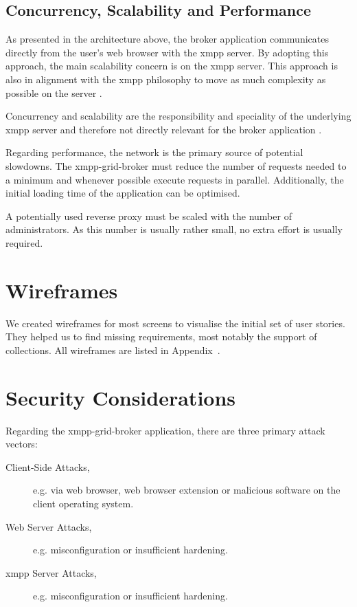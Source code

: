 \subsection{Concurrency, Scalability and Performance}

As presented in the architecture above, the \gls{broker} application communicates directly from the user's web browser with the \gls{xmpp} server.
By adopting this approach, the main scalability concern is on the \gls{xmpp} server.
This approach is also in alignment with the \gls{xmpp} philosophy to move as much complexity as possible on the server \cite{definitive-guide-xmpp}.

Concurrency and scalability are the responsibility and speciality of the underlying \gls{xmpp} server and therefore not directly relevant for the \gls{broker} application \cite{definitive-guide-xmpp}.

Regarding performance, the network is the primary source of potential slowdowns.
The \gls{xmpp-grid-broker} must reduce the number of requests needed to a minimum and whenever possible execute requests in parallel.
Additionally, the initial loading time of the application can be optimised.

A potentially used reverse proxy must be scaled with the number of administrators.
As this number is usually rather small, no extra effort is usually required.

\section{Wireframes}

We created wireframes for most screens to visualise the initial set of user stories.
They helped us to find missing requirements, most notably the support of collections.
All wireframes are listed in Appendix~.

\section{Security Considerations}\label{sec:security-considerations}

Regarding the \gls{xmpp-grid-broker} application, there are three primary attack vectors:

\begin{description}
    \item[Client-Side Attacks,] e.g. via web browser, web browser extension or malicious software on the client operating system.
    \item[Web Server Attacks,] e.g. misconfiguration or insufficient hardening.
    \item[\gls{xmpp} Server Attacks,] e.g. misconfiguration or insufficient hardening.
\end{description}

